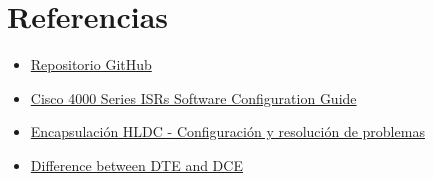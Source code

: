 \documentclass{article}
\begin{document}
    \pagebreak
    \section{Referencias}
        \begin{itemize}
            \item \href{https://github.com/MarianC312/Laboratorio_4_Enlaces_WAN}{Repositorio GitHub}
            \item \href{https://www.cisco.com/c/en/us/td/docs/routers/access/4400/software/configuration/guide/isr4400swcfg.pdf}{Cisco 4000 Series ISRs Software Configuration Guide}
            \item \href{https://ccnadesdecero.es/encapsulacion-hdlc-configuracion-y-resolucion-problemas/}{Encapsulación HLDC - Configuración y resolución de problemas}
            \item \href{https://www.geeksforgeeks.org/difference-between-dte-and-dce/?ref=gcse}{Difference between DTE and DCE}
        \end{itemize}
\end{document}
